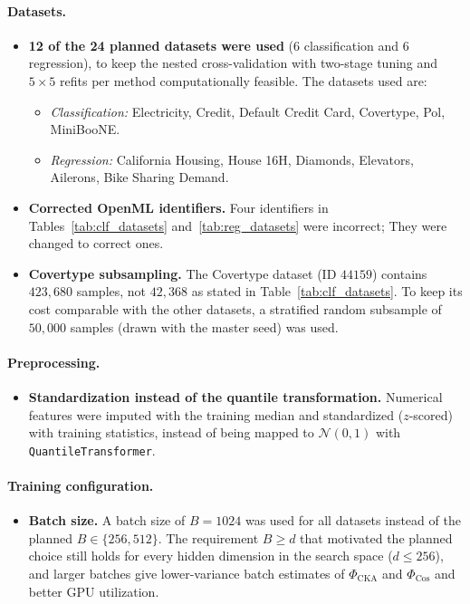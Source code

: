 \documentclass[11pt, a4paper]{article}
\begin{document}
\paragraph{Datasets.}
\begin{itemize}
    \item \textbf{12 of the 24 planned datasets were used} (6 classification and 6 regression), to keep the nested cross-validation with two-stage tuning and $5 \times 5$ refits per method computationally feasible. The datasets used are:
    \begin{itemize}
        \item \textit{Classification:} Electricity, Credit, Default Credit Card, Covertype, Pol, MiniBooNE.
        \item \textit{Regression:} California Housing, House 16H, Diamonds, Elevators, Ailerons, Bike Sharing Demand.
    \end{itemize}
    \item \textbf{Corrected OpenML identifiers.} Four identifiers in Tables~\ref{tab:clf_datasets} and~\ref{tab:reg_datasets} were incorrect; They were changed to correct ones.
    \item \textbf{Covertype subsampling.} The Covertype dataset (ID $44159$) contains $423{,}680$ samples, not $42{,}368$ as stated in Table~\ref{tab:clf_datasets}. To keep its cost comparable with the other datasets, a stratified random subsample of $50{,}000$ samples (drawn with the master seed) was used.
\end{itemize}

\paragraph{Preprocessing.}
\begin{itemize}
    \item \textbf{Standardization instead of the quantile transformation.} Numerical features were imputed with the training median and standardized ($z$-scored) with training statistics, instead of being mapped to $\mathcal{N}(0, 1)$ with \texttt{QuantileTransformer}.
\end{itemize}

\paragraph{Training configuration.}
\begin{itemize}
    \item \textbf{Batch size.} A batch size of $B = 1024$ was used for all datasets instead of the planned $B \in \{256, 512\}$. The requirement $B \ge d$ that motivated the planned choice still holds for every hidden dimension in the search space ($d \le 256$), and larger batches give lower-variance batch estimates of $\Phi_{\text{CKA}}$ and $\Phi_{\text{Cos}}$ and better GPU utilization.
\end{itemize}
\end{document}
